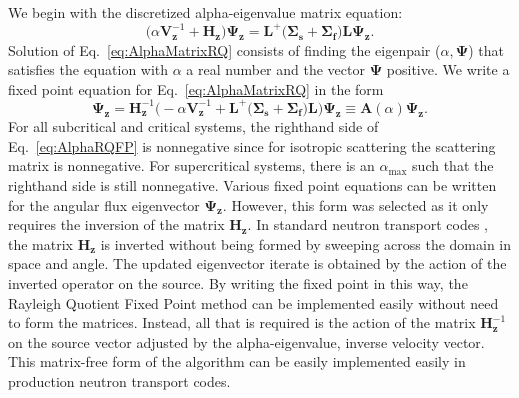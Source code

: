 We begin with the discretized alpha-eigenvalue matrix equation:
\begin{equation}
	\big ( \alpha \mathbf{V}_{\mathbf{z}}^{-1} + \mathbf{H_{z}} \big ) \mathbf{\Psi_{z}} = \mathbf{L}^{+} \big ( \mathbf{\Sigma_{s}} + \mathbf{\Sigma_{f}} \big ) \mathbf{L} \mathbf{\Psi_{z}}.
	\label{eq:AlphaMatrixRQ}
\end{equation}
Solution of Eq.~\ref{eq:AlphaMatrixRQ} consists of finding the eigenpair ($\alpha,\mathbf{\Psi}$) that satisfies the equation with $\alpha$ a real number and the vector $\mathbf{\Psi}$ positive. We write a fixed point equation for Eq.~\ref{eq:AlphaMatrixRQ} in the form
\begin{equation}
	\mathbf{\Psi_{z}} = \mathbf{H}^{-1}_{\mathbf{z}} \big ( -\alpha \mathbf{V}_{\mathbf{z}}^{-1} + \mathbf{L}^{+} \big ( \mathbf{\Sigma_{s}} + \mathbf{\Sigma_{f}} \big ) \mathbf{L} \big ) \mathbf{\Psi_{z}} \equiv \mathbf{A}(\alpha) \mathbf{\Psi_{z}}.
	\label{eq:AlphaRQFP}
\end{equation}
For all subcritical and critical systems, the righthand side of Eq.~\ref{eq:AlphaRQFP} is nonnegative since for isotropic scattering the scattering matrix is nonnegative. For supercritical systems, there is an $\alpha_{\text{max}}$ such that the righthand side is still nonnegative. Various fixed point equations can be written for the angular flux eigenvector $\mathbf{\Psi_{z}}$. However, this form was selected as it only requires the inversion of the matrix $\mathbf{H_{z}}$. In standard neutron transport codes \cite{hanebutte_ardra_1999} \cite{alcouffe2005partisn}, the matrix $\mathbf{H_{z}}$ is inverted without being formed by sweeping across the domain in space and angle. The updated eigenvector iterate is obtained by the action of the inverted operator on the source. By writing the fixed point in this way, the Rayleigh Quotient Fixed Point method can be implemented easily without need to form the matrices. Instead, all that is required is the action of the matrix $\mathbf{H}^{-1}_{\mathbf{z}}$ on the source vector adjusted by the alpha-eigenvalue, inverse velocity vector. This matrix-free form of the algorithm can be easily implemented easily in production neutron transport codes.


